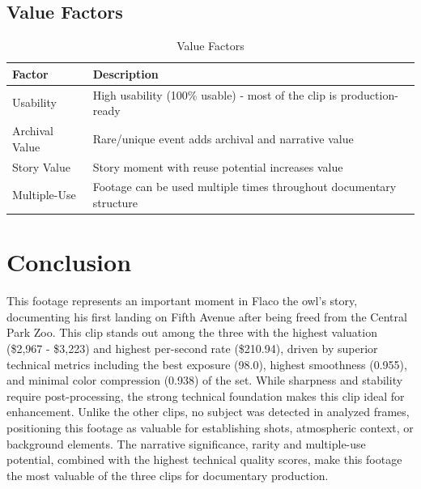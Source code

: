 \documentclass[
  11pt,
]{article}
\begin{document}
\needspace{12cm}
\subsection{Value Factors}

\begin{table}[h]
\centering
\small
\caption{Value Factors}
\label{tab-value-factors}
\begin{tabular}{p{3cm}p{7cm}}
\toprule
\textbf{Factor} & \textbf{Description} \\
\midrule
Usability & High usability (100\% usable) - most of the clip is production-ready \\
Archival Value & Rare/unique event adds archival and narrative value \\
Story Value & Story moment with reuse potential increases value \\
Multiple-Use & Footage can be used multiple times throughout documentary structure \\
\bottomrule
\end{tabular}
\end{table}

\section{Conclusion}

This footage represents an important moment in Flaco the owl's story,
documenting his first landing on Fifth Avenue after being freed from the
Central Park Zoo. This clip stands out among the three with the highest
valuation (\$2,967 - \$3,223) and highest per-second rate (\$210.94),
driven by superior technical metrics including the best exposure (98.0),
highest smoothness (0.955), and minimal color compression (0.938) of the
set. While sharpness and stability require post-processing, the strong
technical foundation makes this clip ideal for enhancement. Unlike the
other clips, no subject was detected in analyzed frames, positioning
this footage as valuable for establishing shots, atmospheric context, or
background elements. The narrative significance, rarity and multiple-use
potential, combined with the highest technical quality scores, make this
footage the most valuable of the three clips for documentary production.
\end{document}
